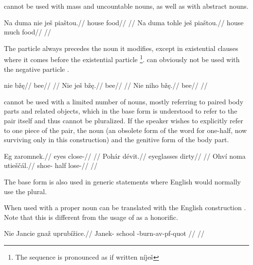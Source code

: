  cannot be used with mass and uncountable nouns, as well as with abstract nouns.

\pex
\a
\begingl
\gla *Na duma nie je\v{s} pia\v{s}tou.//
\glb {} house   food//
\glft {}//
\endgl
\a
\begingl
\gla Na duma tohle je\v{s} pia\v{s}tou.//
\glb {} house much  food//
\glft {}//
\endgl
\xe

The particle  always precedes the noun it modifies, except in existential clauses where it comes before the existential particle \footnote{The sequence is pronounced as if written n\'ije\v{s} }.  can obviously not be used with the negative particle .

\pex
\a
\begingl
\gla nie b\v{z}\k{e}//
\glb {} bee//
\glft {}//
\endgl
\a
\begingl
\gla Nie je\v{s} b\v{z}\k{e}.//
\glb {}  bee//
\glft {}//
\endgl
\a
\begingl
\gla *Nie niho b\v{z}\k{e}.//
\glb {}  bee//
\glft {}//
\endgl
\xe

 cannot be used with a limited number of nouns, mostly referring to paired body parts and related objects, which in the base form is understood to refer to the pair itself and thus cannot be pluralized. If the speaker wishes to explicitly refer to one piece of the pair, the noun  (an obsolete form of the word for one-half, now surviving only in this construction) and the genitive form of the body part.

\pex
\begingl
\gla Eg zaromnek.//
\glb eyes close-//
\glft {}//
\endgl
\xe
\pex
\begingl
\gla Poh\'ar d\'evit.//
\glb eyeglasses dirty//
\glft {}//
\endgl
\xe
\pex
\begingl
\gla Ohv\'i noma utie\v{s}\v{c}\'al.//
\glb shoe- half lose-//
\glft {}//
\endgl
\xe

The base form is also used in generic statements where English would normally use the plural.


When used with a proper noun  can be translated with the English construction . Note that this is different from the usage of  as a honorific.

\pex
\begingl
    \gla Nie Jancie gna\v{z} uprub\'i\v{z}ice.//
    \glb {} Janek- school -burn-{av-pf-quot} //
    \glft {}//
\endgl
\xe

